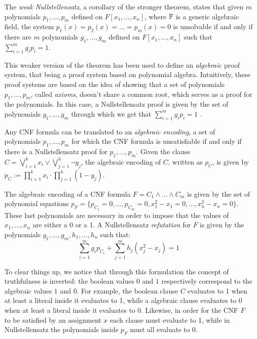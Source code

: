 The \textit{weak Nullstellensatz}, a corollary of the stronger theorem, states that given $m$ polynomials $p_1, \ldots, p_m$ defined on $F[x_1, \ldots, x_n]$, where $\mathbb{F}$ is a generic algebraic field, the system $p_1(x) = p_2(x) = \ldots = p_m(x) = 0$ is unsolvable if and only if there are $m$ polynomials $g_1, \ldots, g_m$ defined on $F[x_1, \ldots, x_n]$ such that $\sum_{i=1}^m g_ip_i = 1$.

This weaker version of the theorem has been used to define an \textit{algebraic} proof system, that being a proof system based on polynomial algebra. Intuitively, these proof systems are based on the idea of showing that a set of polynomials $p_1, \ldots, p_m$, called \textit{axioms}, doesn't share a common root, which serves as a proof for the polynomials. In this case, a Nullstellensatz proof is given by the set of polynomials $g_1, \ldots, g_m$ through which we get that $\sum_{i=1}^m g_ip_i = 1$  \cite{ns_definitions}. 

\newpage


Any CNF formula can be translated to an \textit{algebraic encoding}, a set of polynomials $p_1, \ldots, p_m$ for which the CNF formula is unsatisfiable if and only if there is a Nullstellensatz proof for $p_1, \ldots, p_m$. Given the clause $C = \bigvee_{i = 1}^k x_i \lor \bigvee_{j = 1}^h \lnot y_j$, the algebraic encoding of $C$, written as $p_C$, is given by $p_C := \prod_{i = 1}^{k} x_i \cdot \prod_{j = 1}^h (1- y_j)$.

The algebraic encoding of a CNF formula $F = C_1 \land \ldots \land C_m$ is given by the set of polynomial equations $p_F = \{p_{C_1} = 0, \ldots, p_{C_m} = 0, x_1^2-x_1 = 0, \ldots, x_n^2-x_n = 0\}$. These last polynomials are necessary in order to impose that the values of $x_1, \ldots, x_n$ are either a 0 or a 1. A Nullstellensatz \textit{refutation} for $F$ is given by the polynomials $g_1, \ldots, g_m, h_1, \ldots, h_n$ such that:
\[\sum_{i = 1}^m g_ip_{C_i} + \sum_{j = 1}^m h_j(x_j^2-x_j) = 1\]

To clear things up, we notice that through this formulation the concept of truthfulness is inverted: the boolean values $0$ and $1$ respectively correspond to the algebraic values $1$ and $0$. For example, the boolean clause $C$ evaluates to 1 when at least a literal inside it evaluates to 1, while a algebraic clause evaluates to 0 when at least a literal inside it evaluates to 0. Likewise, in order for the CNF $F$ to be satisfied by an assignment $x$ each clause must evaluate to 1, while in Nullstellensatz the polynomials inside $p_F$ must all evaluate to 0. 

